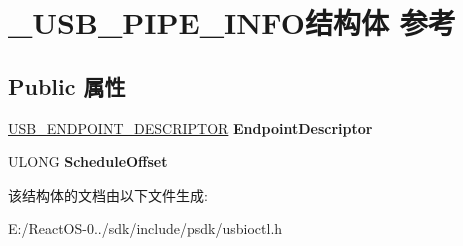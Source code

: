 \hypertarget{struct___u_s_b___p_i_p_e___i_n_f_o}{}\section{\+\_\+\+U\+S\+B\+\_\+\+P\+I\+P\+E\+\_\+\+I\+N\+F\+O结构体 参考}
\label{struct___u_s_b___p_i_p_e___i_n_f_o}
\subsection*{Public 属性}
\begin{DoxyCompactItemize}
\item 
\mbox{\label{struct___u_s_b___p_i_p_e___i_n_f_o_a13391433cf6b6dbd4fa391a94c634364}} 
\hyperlink{struct___u_s_b___e_n_d_p_o_i_n_t___d_e_s_c_r_i_p_t_o_r}{U\+S\+B\+\_\+\+E\+N\+D\+P\+O\+I\+N\+T\+\_\+\+D\+E\+S\+C\+R\+I\+P\+T\+OR} {\bfseries Endpoint\+Descriptor}
\item 
\mbox{\label{struct___u_s_b___p_i_p_e___i_n_f_o_a92aa0c1a550da7ce3a8f713826378fec}} 
U\+L\+O\+NG {\bfseries Schedule\+Offset}
\end{DoxyCompactItemize}


该结构体的文档由以下文件生成\+:\begin{DoxyCompactItemize}
\item 
E\+:/\+React\+O\+S-\/0../sdk/include/psdk/usbioctl.\+h\end{DoxyCompactItemize}
